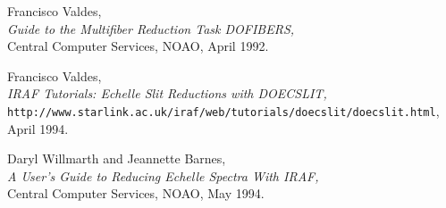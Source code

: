 \documentclass[twoside,11pt]{article}
\newcommand{\htmladdnormallink}[2]{#1}
\begin{document}
\begin{thebibliography}{999}
 Francisco Valdes,\\
      {\sl Guide to the Multifiber Reduction Task DOFIBERS,}\\
      Central Computer Services, NOAO, April 1992.

 Francisco Valdes,\\
      {\sl
      \htmladdnormallink{IRAF Tutorials: Echelle Slit Reductions with DOECSLIT}
      {http://www.starlink.ac.uk/iraf/web/tutorials/doecslit/doecslit.html},}\\
      {\tt http://www.starlink.ac.uk/iraf/web/tutorials/doecslit/doecslit.html},
      \\
      April 1994.

 Daryl Willmarth and Jeannette Barnes,\\
      {\sl
      \htmladdnormallink{A User's Guide to Reducing Echelle Spectra With IRAF}
      {file://iraf.noao.edu/iraf/docs/ech.ps.Z},}\\
      Central Computer Services, NOAO, May 1994.

\end{thebibliography}
\end{document}
